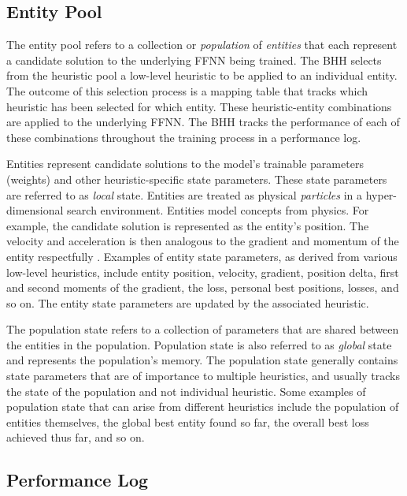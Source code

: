 \documentclass[preprint,review,12pt]{elsarticle}
\begin{document}
\subsection{Entity Pool}\label{sec:bhh:entity_pool}

The entity pool refers to a collection or \textit{population} of \textit{entities} that each represent a candidate solution to the underlying \acs{FFNN} being trained. The \acs{BHH} selects from the heuristic pool a low-level heuristic to be applied to an individual entity. The outcome of this selection process is a mapping table that tracks which heuristic has been selected for which entity. These heuristic-entity combinations are applied to the underlying \acs{FFNN}. The \acs{BHH} tracks the performance of each of these combinations throughout the training process in a performance log.

Entities represent candidate solutions to the model's trainable parameters (weights) and other heuristic-specific state parameters. These state parameters are referred to as \textit{local} state. Entities are treated as physical \textit{particles} in a hyper-dimensional search environment. Entities model concepts from physics. For example, the candidate solution is represented as the entity's position. The velocity and acceleration is then analogous to the gradient and momentum of the entity respectfully \cite{ref:eberhart:1995}. Examples of entity state parameters, as derived from various low-level heuristics, include entity position, velocity, gradient, position delta, first and second moments of the gradient, the loss, personal best positions, losses, and so on. The entity state parameters are updated by the associated heuristic.

The population state refers to a collection of parameters that are shared between the entities in the population. Population state is also referred to as \textit{global} state and represents the population's memory. The population state generally contains state parameters that are of importance to multiple heuristics, and usually tracks the state of the population and not individual heuristic. Some examples of population state that can arise from different heuristics include the population of entities themselves, the global best entity found so far, the overall best loss achieved thus far, and so on.

\subsection{Performance Log}\label{sec:bhh:performance_log}
\end{document}
